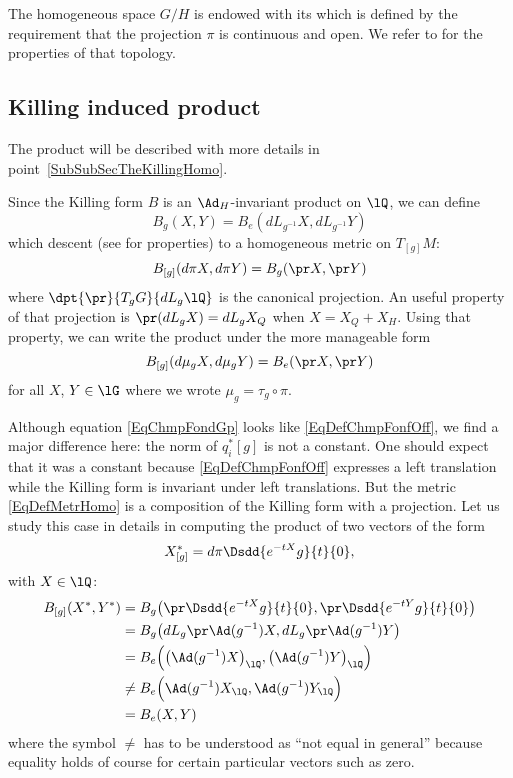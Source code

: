 The homogeneous space $G/H$ is endowed with its  which is defined by the requirement that the projection $\pi$ is continuous and open. We refer to \cite{Helgason} for the properties of that topology.

\subsection{Killing induced product}		\label{SubsecKillHomo}

The product will be described with more details in point~\ref{SubSubSecTheKillingHomo}.

Since the Killing form $B$ is an $\Ad_H$-invariant product on $\lQ$, we can define
\begin{equation}
B_g(X,Y)=B_e(dL_{g^{-1}}X,dL_{g^{-1}}Y)
\end{equation}
which descent (see \cite{Kerin} for properties) to a homogeneous metric on $T_{[g]}M$:
\begin{equation}  \label{EqDefMetrHomo}
B_{[g]}(d\pi X,d\pi Y)=B_g(\pr X,\pr Y)
\end{equation}
where $\dpt{\pr}{T_gG}{dL_g\lQ}$ is the canonical projection. An useful property of that projection is $\pr(dL_gX)=dL_gX_Q$ when $X=X_Q+X_H$. Using that property, we can write the product under the more manageable form
\[
  B_{[g]}(d\mu_gX,d\mu_gY)=B_e(\pr X,\pr Y)
\]
for all $X$, $Y\in\lG$ where we wrote $\mu_g=\tau_g\circ \pi$.

Although equation \eqref{EqChmpFondGp} looks like \eqref{EqDefChmpFonfOff}, we find a major difference here: the norm of $q_i^*[g]$ is not a constant. One should expect that it was a constant because \eqref{EqDefChmpFonfOff} expresses a left translation while the Killing form is invariant under left translations. But the metric \eqref{EqDefMetrHomo} is a composition of the Killing form with a projection. Let us study this case in details in computing the product of two vectors of the form
\[
  X^*_{[g]}=d\pi\Dsdd{  e^{-tX}g }{t}{0},
\]
with $X\in\lQ$:
\[
\begin{split}
  B_{[g]}(X^*,Y^*)&=B_g\big( \pr\Dsdd{  e^{-tX}g }{t}{0},\pr\Dsdd{  e^{-tY}g }{t}{0} \big)\\
		&=B_g\big( dL_g\pr\Ad(g^{-1})X,dL_g\pr\Ad(g^{-1})Y \big)\\
		&=B_e\Big(   \big( \Ad(g^{-1})X \big)_{\lQ},\big( \Ad(g^{-1})Y \big)_{\lQ}  \Big)\\
		&\neq B_e\Big(   \Ad(g^{-1})X_{\lQ},\Ad(g^{-1})Y_{\lQ}  \Big)\\
		&=B_e(X,Y)
\end{split}
\]
where the symbol $\neq$ has to be understood as ``not equal in general'' because equality holds of course for certain particular vectors such as zero.


